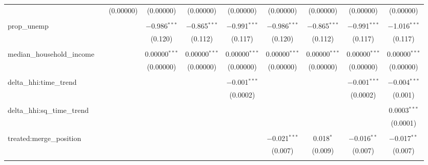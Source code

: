 \begin{table}[H]
{\begin{tabular}{@{\extracolsep{5pt}}lccccccccc}
   &  & (0.00000) & (0.00000) & (0.00000) & (0.00000) & (0.00000) & (0.00000) & (0.00000) & (0.00000) \\  

   & & & & & & & & & \\  

  prop\_unemp &  &  & $-$0.986$^{***}$ & $-$0.865$^{***}$ & $-$0.991$^{***}$ & $-$0.986$^{***}$ & $-$0.865$^{***}$ & $-$0.991$^{***}$ & $-$1.016$^{***}$ \\  

   &  &  & (0.120) & (0.112) & (0.117) & (0.120) & (0.112) & (0.117) & (0.117) \\  

   & & & & & & & & & \\  

  median\_household\_income &  &  & 0.00000$^{***}$ & 0.00000$^{***}$ & 0.00000$^{***}$ & 0.00000$^{***}$ & 0.00000$^{***}$ & 0.00000$^{***}$ & 0.00000$^{***}$ \\  

   &  &  & (0.00000) & (0.00000) & (0.00000) & (0.00000) & (0.00000) & (0.00000) & (0.00000) \\  

   & & & & & & & & & \\  

  delta\_hhi:time\_trend &  &  &  &  & $-$0.001$^{***}$ &  &  & $-$0.001$^{***}$ & $-$0.004$^{***}$ \\  

   &  &  &  &  & (0.0002) &  &  & (0.0002) & (0.001) \\  

   & & & & & & & & & \\  

  delta\_hhi:sq\_time\_trend &  &  &  &  &  &  &  &  & 0.0003$^{***}$ \\  

   &  &  &  &  &  &  &  &  & (0.0001) \\  

   & & & & & & & & & \\  

  treated:merge\_position &  &  &  &  &  & $-$0.021$^{***}$ & 0.018$^{*}$ & $-$0.016$^{**}$ & $-$0.017$^{**}$ \\  

   &  &  &  &  &  & (0.007) & (0.009) & (0.007) & (0.007) \\  

   & & & & & & & & & \\  


\end{tabular}}
\end{table}
